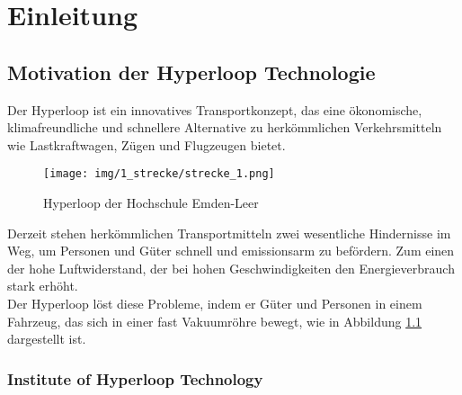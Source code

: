 \chapter{Einleitung}
\label{chapter:Einleitung}

\section{Motivation der Hyperloop Technologie}
\label{section:Motivation}

Der Hyperloop ist ein innovatives Transportkonzept, das eine ökonomische, klimafreundliche und schnellere Alternative zu herkömmlichen Verkehrsmitteln wie Lastkraftwagen, Zügen und Flugzeugen bietet.\\
\pagebreak[3]
\begin{figure}[!ht]
	\begin{center}
		\texttt{[image: img/1\_strecke/strecke\_1.png]}
		\caption{Hyperloop der Hochschule Emden-Leer}
		\label{img_1_1:strecke}
	\end{center}
\end{figure}
\pagebreak[4]
Derzeit stehen herkömmlichen Transportmitteln zwei wesentliche Hindernisse im Weg, um Personen und Güter schnell und emissionsarm zu befördern. Zum einen der hohe Luftwiderstand, der bei hohen Geschwindigkeiten den Energieverbrauch stark erhöht.\\
Der Hyperloop löst diese Probleme, indem er Güter und Personen in einem Fahrzeug, das sich in einer fast Vakuumröhre bewegt, wie in Abbildung \ref{img_1_1:strecke} dargestellt ist.






\subsection*{Institute of Hyperloop Technology}
\label{section:IHT}


